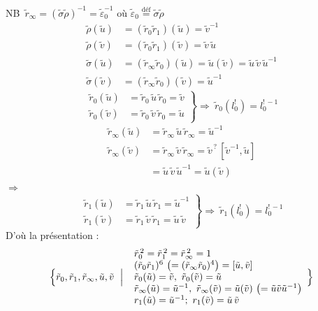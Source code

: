 \documentclass[11pt,a4paper]{article}
\begin{document}
NB $\,\tilde r_\infty = (\tilde\sigma\tilde\rho)^{-1} = \tilde\varepsilon_0^{-1}$
où $\tilde\varepsilon_0 \overset{\text{déf}}{=} \tilde\sigma\tilde\rho$
\[
  \begin{aligned}
    \tilde\rho(\tilde u) &= (\tilde r_0\tilde r_1)(\tilde u) = \tilde v^{-1}\\
    \tilde\rho(\tilde v) &= (\tilde r_0\tilde r_1)(\tilde v) = \tilde v\,\tilde u\\
    \tilde\sigma(\tilde u) &= (\tilde r_\infty\tilde r_0)(\tilde u) = \tilde u(\tilde v) = \tilde u\,\tilde v\,\tilde u^{-1}\\
    \tilde\sigma(\tilde v) &= (\tilde r_\infty\tilde r_0)(\tilde v) = \tilde u^{-1}
  \end{aligned}
\]
\[
  \left.
  \begin{aligned}
    \tilde r_0(\tilde u) &= \tilde r_0\,\tilde u\,\tilde r_0 = \tilde v\\
    \tilde r_0(\tilde v) &= \tilde r_0\,\tilde v\,\tilde r_0 = \tilde u
  \end{aligned}
  \right\}
  \Longrightarrow\ \tilde r_0(l^!_0) = l^{!\,-1}_0
\]
\[
  \begin{aligned}
    \tilde r_\infty(\tilde u) &= \tilde r_\infty\,\tilde u\,\tilde r_\infty = \tilde u^{-1}\\
    \tilde r_\infty(\tilde v) &= \tilde r_\infty\,\tilde v\,\tilde r_\infty
    = \tilde v^{\,?}\,[\tilde v^{-1},\tilde u]\\
    &= \tilde u\,\tilde v\,\tilde u^{-1} = \tilde u(\tilde v)
  \end{aligned}
\]
$\Longrightarrow$ 
\[
  \left.
  \begin{aligned}
    \tilde r_1(\tilde u) &= \tilde r_1\,\tilde u\,\tilde r_1 = \tilde u^{-1}\\
    \tilde r_1(\tilde v) &= \tilde r_1\,\tilde v\,\tilde r_1 = \tilde u\,\tilde v
  \end{aligned}
  \right\}
  \Longrightarrow\ \tilde r_1(l^!_0) = l^{!\,-1}_0
\]
D'où la présentation :
\[
  \Bigl\{\tilde r_0,\tilde r_1,\tilde r_\infty,\tilde u,\tilde v \ \Bigm|\
  \begin{array}{l}
    \tilde r_0^{\,2} = \tilde r_1^{\,2} = \tilde r_\infty^{\,2}
      = 1\\
    (\tilde r_0\tilde r_1)^{6}\ \bigl(= (\tilde r_\infty\tilde r_0)^4\bigr) = [\tilde u,\tilde v]\\
    \tilde r_0(\tilde u) = \tilde v,\ \tilde r_0(\tilde v) = \tilde u\\
    \tilde r_\infty(\tilde u) = \tilde u^{-1},\ \tilde r_\infty(\tilde v) = \tilde u(\tilde v)\ \bigl(= \tilde u\tilde v\tilde u^{-1}\bigr)\\
    r_1(\tilde u) = \tilde u^{-1};\ r_1(\tilde v) = \tilde u\,\tilde v
  \end{array}
  \Bigr\}
\]
\end{document}
